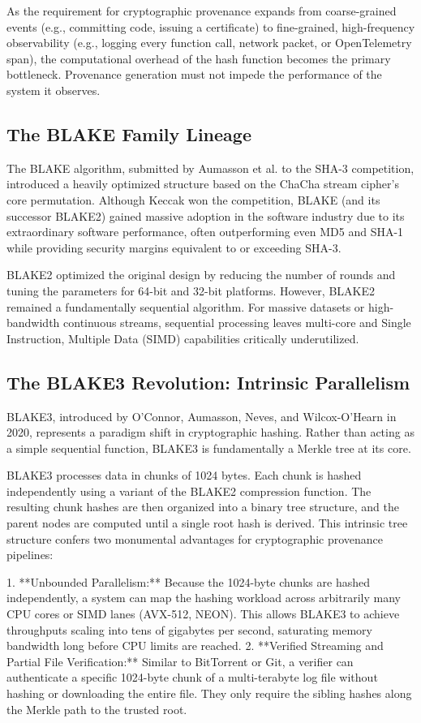 As the requirement for cryptographic provenance expands from coarse-grained events (e.g., committing code, issuing a certificate) to fine-grained, high-frequency observability (e.g., logging every function call, network packet, or OpenTelemetry span), the computational overhead of the hash function becomes the primary bottleneck. Provenance generation must not impede the performance of the system it observes.

\subsection{The BLAKE Family Lineage}
The BLAKE algorithm, submitted by Aumasson et al. to the SHA-3 competition, introduced a heavily optimized structure based on the ChaCha stream cipher's core permutation. Although Keccak won the competition, BLAKE (and its successor BLAKE2) gained massive adoption in the software industry due to its extraordinary software performance, often outperforming even MD5 and SHA-1 while providing security margins equivalent to or exceeding SHA-3.

BLAKE2 optimized the original design by reducing the number of rounds and tuning the parameters for 64-bit and 32-bit platforms. However, BLAKE2 remained a fundamentally sequential algorithm. For massive datasets or high-bandwidth continuous streams, sequential processing leaves multi-core and Single Instruction, Multiple Data (SIMD) capabilities critically underutilized.

\subsection{The BLAKE3 Revolution: Intrinsic Parallelism}
BLAKE3, introduced by O'Connor, Aumasson, Neves, and Wilcox-O'Hearn in 2020, represents a paradigm shift in cryptographic hashing. Rather than acting as a simple sequential function, BLAKE3 is fundamentally a Merkle tree at its core. 

BLAKE3 processes data in chunks of 1024 bytes. Each chunk is hashed independently using a variant of the BLAKE2 compression function. The resulting chunk hashes are then organized into a binary tree structure, and the parent nodes are computed until a single root hash is derived. This intrinsic tree structure confers two monumental advantages for cryptographic provenance pipelines:

1.  **Unbounded Parallelism:** Because the 1024-byte chunks are hashed independently, a system can map the hashing workload across arbitrarily many CPU cores or SIMD lanes (AVX-512, NEON). This allows BLAKE3 to achieve throughputs scaling into tens of gigabytes per second, saturating memory bandwidth long before CPU limits are reached.
2.  **Verified Streaming and Partial File Verification:** Similar to BitTorrent or Git, a verifier can authenticate a specific 1024-byte chunk of a multi-terabyte log file without hashing or downloading the entire file. They only require the sibling hashes along the Merkle path to the trusted root.

